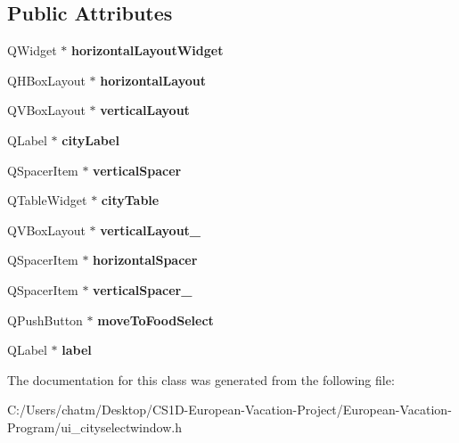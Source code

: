 \subsection*{Public Attributes}
\begin{DoxyCompactItemize}
\item 
\mbox{\label{class_ui___city_select_window_a3e53028173cbbf04da4c5f638db808a2}} 
Q\+Widget $\ast$ {\bfseries horizontal\+Layout\+Widget}
\item 
\mbox{\label{class_ui___city_select_window_abecf94169bfceaba9cd2af74ad17fa3c}} 
Q\+H\+Box\+Layout $\ast$ {\bfseries horizontal\+Layout}
\item 
\mbox{\label{class_ui___city_select_window_acded47f2b55608b7c94d663eafaa7161}} 
Q\+V\+Box\+Layout $\ast$ {\bfseries vertical\+Layout}
\item 
\mbox{\label{class_ui___city_select_window_af78028903db7e6b82f9d2fb50d3182d7}} 
Q\+Label $\ast$ {\bfseries city\+Label}
\item 
\mbox{\label{class_ui___city_select_window_ada1a648f4c296da23f2aa436d89a2a8e}} 
Q\+Spacer\+Item $\ast$ {\bfseries vertical\+Spacer}
\item 
\mbox{\label{class_ui___city_select_window_a1973807be1feaaff2a82baafd22fbc14}} 
Q\+Table\+Widget $\ast$ {\bfseries city\+Table}
\item 
\mbox{\label{class_ui___city_select_window_ace2b6ccce87189099a910e1006229c63}} 
Q\+V\+Box\+Layout $\ast$ {\bfseries vertical\+Layout\+\_}
\item 
\mbox{\label{class_ui___city_select_window_a828bacc5d217e191957c302459512c55}} 
Q\+Spacer\+Item $\ast$ {\bfseries horizontal\+Spacer}
\item 
\mbox{\label{class_ui___city_select_window_ad1c67d5ed659c7671b8057d74e90a0a5}} 
Q\+Spacer\+Item $\ast$ {\bfseries vertical\+Spacer\+\_}
\item 
\mbox{\label{class_ui___city_select_window_a4ea2d95b45c0265a1f00dd4f3c85dd9c}} 
Q\+Push\+Button $\ast$ {\bfseries move\+To\+Food\+Select}
\item 
\mbox{\label{class_ui___city_select_window_a48a5eae660eebf0df3e4aa7cf2173106}} 
Q\+Label $\ast$ {\bfseries label}
\end{DoxyCompactItemize}


The documentation for this class was generated from the following file\+:\begin{DoxyCompactItemize}
\item 
C\+:/\+Users/chatm/\+Desktop/\+C\+S1\+D-\/\+European-\/\+Vacation-\/\+Project/\+European-\/\+Vacation-\/\+Program/ui\+\_\+cityselectwindow.\+h\end{DoxyCompactItemize}
